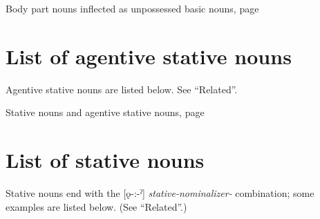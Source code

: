 \begin{CayugaRelated}
\item Body part nouns inflected as unpossessed basic nouns, page \pageref{ch:Body part nouns inflected as unpossessed basic nouns}
\end{CayugaRelated}

\section{List of agentive stative nouns} \label{ch:list of agentive stative nouns}
Agentive stative nouns are listed below. See “Related”.

\begin{multicols}{2}
 
 
 
 
 
 
 
 
 

\end{multicols}

\begin{CayugaRelated}
\item Stative nouns and agentive stative nouns, page \pageref{ch:Stative nouns and agentive stative nouns}
\end{CayugaRelated}

\section{List of stative nouns} \label{ch:list of stative nouns}
Stative nouns end with the [ǫ-:-ˀ] \textit{stative-nominalizer-\nsf} combination; some examples are listed below. (See “Related”.)


